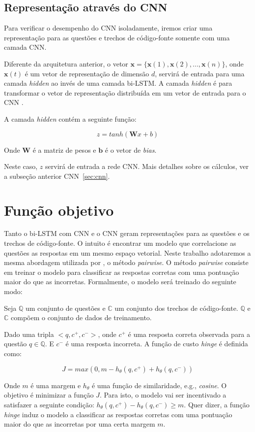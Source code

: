 \subsection{Representação através do CNN}
\label{sec:representation-cnn}

Para verificar o desempenho do CNN isoladamente, iremos criar uma representação para as questões e trechos de código-fonte somente com uma camada CNN.

Diferente da arquitetura anterior, o vetor $\bm{x} = \{ \bm{x}(1), \bm{x}(2), . . ., \bm{x}(n) \}$, onde $\bm{x}(t)$ é um vetor de representação de dimensão $d$, servirá de entrada para uma camada \textit{hidden} ao invés de uma camada bi-LSTM. A camada \textit{hidden} é para transformar o vetor de representação distribuída em um vetor de entrada para o CNN \citep{tan-lstm-qa}.

A camada \textit{hidden} contém a seguinte função:

\begin{equation}
z = tanh(\bm{W}x + b)
\end{equation}

Onde $\bm{W}$ é a matriz de pesos e $\bm{b}$ é o vetor de \textit{bias}.

Neste caso, $z$ servirá de entrada a rede CNN. Mais detalhes sobre os cálculos, ver a subseção anterior CNN~\ref{sec:cnn}.

\section{Função objetivo}

Tanto o bi-LSTM com CNN e o CNN geram representações para as questões e os trechos de código-fonte. O intuito é encontrar um modelo que correlacione as questões as respostas em um mesmo espaço vetorial. Neste trabalho adotaremos a mesma abordagem utilizada por \cite{feng-2015}, o método \textit{pairwise}. O método \textit{pairwise} consiste em treinar o modelo para classificar as respostas corretas com uma pontuação maior do que as incorretas. Formalmente, o modelo será treinado do seguinte modo:

Seja $\mathbb{Q}$ um conjunto de questões e $\mathbb{C}$ um conjunto dos trechos de código-fonte. $\mathbb{Q}$ e $\mathbb{C}$ compõem o conjunto de dados de treinamento.

Dado uma tripla $<q, c^{+}, c^{-}>$, onde $c^{+}$ é uma resposta correta observada para a questão $q \in \mathbb{Q}$. E $c^{-}$ é uma resposta incorreta. A função de custo \textit{hinge} é definida como:

\begin{equation}
J = max(0, m - h_{\theta}(q, c^{+}) + h_{\theta}(q, c^{-}))
\end{equation}

Onde $m$ é uma margem e $h_{\theta}$ é uma função de similaridade, e.g., \textit{cosine}. O objetivo é minimizar a função $J$. Para isto, o modelo vai ser incentivado a satisfazer a seguinte condição: $h_{\theta}(q, c^{+}) - h_{\theta}(q, c^{-}) \geq m$. Quer dizer, a função \textit{hinge} induz o modelo a classificar as respostas corretas com uma pontuação maior do que as incorretas por uma certa margem $m$.


